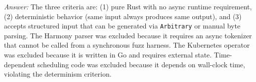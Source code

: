 \begin{enumerate}
  \emph{Answer:} The three criteria are: (1) pure Rust with no async runtime requirement, (2) deterministic behavior (same input always produces same output), and (3) accepts structured input that can be generated via \texttt{Arbitrary} or manual byte parsing. The Harmony parser was excluded because it requires an async tokenizer that cannot be called from a synchronous fuzz harness. The Kubernetes operator was excluded because it is written in Go and requires external state. Time-dependent scheduling code was excluded because it depends on wall-clock time, violating the determinism criterion.
\end{enumerate}
